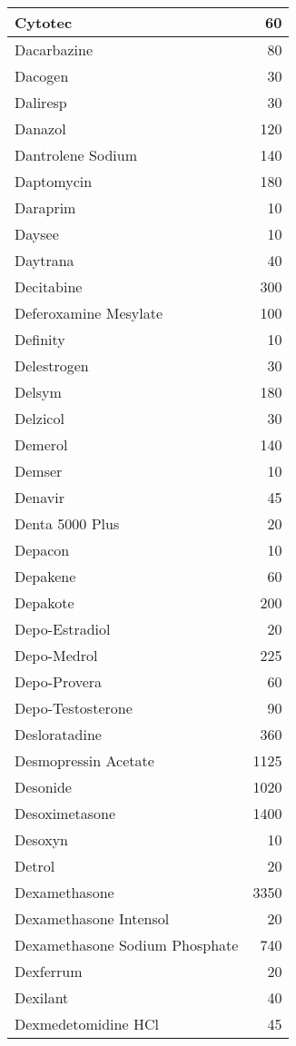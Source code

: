 \documentclass[
]{article}
\begin{document}
\begin{table}
\begin{tabular}[t]{l|r}
\hline
Cytotec & 60\\
\hline
Dacarbazine & 80\\
\hline
Dacogen & 30\\
\hline
Daliresp & 30\\
\hline
Danazol & 120\\
\hline
Dantrolene Sodium & 140\\
\hline
Daptomycin & 180\\
\hline
Daraprim & 10\\
\hline
Daysee & 10\\
\hline
Daytrana & 40\\
\hline
Decitabine & 300\\
\hline
Deferoxamine Mesylate & 100\\
\hline
Definity & 10\\
\hline
Delestrogen & 30\\
\hline
Delsym & 180\\
\hline
Delzicol & 30\\
\hline
Demerol & 140\\
\hline
Demser & 10\\
\hline
Denavir & 45\\
\hline
Denta 5000 Plus & 20\\
\hline
Depacon & 10\\
\hline
Depakene & 60\\
\hline
Depakote & 200\\
\hline
Depo-Estradiol & 20\\
\hline
Depo-Medrol & 225\\
\hline
Depo-Provera & 60\\
\hline
Depo-Testosterone & 90\\
\hline
Desloratadine & 360\\
\hline
Desmopressin Acetate & 1125\\
\hline
Desonide & 1020\\
\hline
Desoximetasone & 1400\\
\hline
Desoxyn & 10\\
\hline
Detrol & 20\\
\hline
Dexamethasone & 3350\\
\hline
Dexamethasone Intensol & 20\\
\hline
Dexamethasone Sodium Phosphate & 740\\
\hline
Dexferrum & 20\\
\hline
Dexilant & 40\\
\hline
Dexmedetomidine HCl & 45\\
\hline

\end{tabular}
\end{table}
\end{document}
